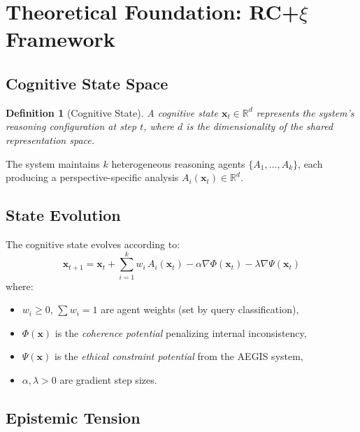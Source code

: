 \documentclass[11pt,a4paper]{article}
\newtheorem{definition}{Definition}
\begin{document}
\section{Theoretical Foundation: RC+$\xi$ Framework}
\label{sec:theory}

\subsection{Cognitive State Space}

\begin{definition}[Cognitive State]
A cognitive state $\mathbf{x}_t \in \mathbb{R}^d$ represents the system's reasoning configuration at step $t$, where $d$ is the dimensionality of the shared representation space.
\end{definition}

The system maintains $k$ heterogeneous reasoning agents $\{A_1, \ldots, A_k\}$, each producing a perspective-specific analysis $A_i(\mathbf{x}_t) \in \mathbb{R}^d$.

\subsection{State Evolution}

The cognitive state evolves according to:
\begin{equation}
\label{eq:evolution}
\mathbf{x}_{t+1} = \mathbf{x}_t + \sum_{i=1}^{k} w_i \, A_i(\mathbf{x}_t) - \alpha \nabla\Phi(\mathbf{x}_t) - \lambda \nabla\Psi(\mathbf{x}_t)
\end{equation}
where:
\begin{itemize}[leftmargin=*,nosep]
  \item $w_i \geq 0$, $\sum w_i = 1$ are agent weights (set by query classification),
  \item $\Phi(\mathbf{x})$ is the \emph{coherence potential} penalizing internal inconsistency,
  \item $\Psi(\mathbf{x})$ is the \emph{ethical constraint potential} from the AEGIS system,
  \item $\alpha, \lambda > 0$ are gradient step sizes.
\end{itemize}

\subsection{Epistemic Tension}
\end{document}
